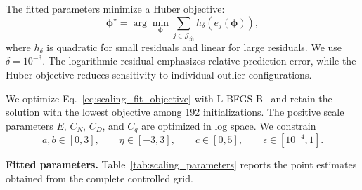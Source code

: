 The fitted parameters minimize a Huber objective:
\begin{equation}
\boldsymbol{\phi}^{\star}
=
\arg\min_{\boldsymbol{\phi}}
\sum_{j\in\mathcal J_{\mathrm{fit}}}
h_{\delta}
\left(
e_j(\boldsymbol{\phi})
\right),
\label{eq:scaling_fit_objective}
\end{equation}
where $h_{\delta}$ is quadratic for small residuals and linear for large residuals.
We use $\delta=10^{-3}$.
The logarithmic residual emphasizes relative prediction error, while the Huber objective reduces sensitivity to individual outlier configurations.

We optimize Eq.~\eqref{eq:scaling_fit_objective} with L-BFGS-B~\cite{byrd1995limited} and retain the solution with the lowest objective among 192 initializations.
The positive scale parameters $E$, $C_N$, $C_D$, and $C_q$ are optimized in log space.
We constrain
\[
a,b\in[0,3],
\qquad
\eta\in[-3,3],
\qquad
c\in[0,5],
\qquad
\epsilon\in[10^{-4},1].
\]

\textbf{Fitted parameters.}
Table~\ref{tab:scaling_parameters} reports the point estimates obtained from the complete controlled grid.

